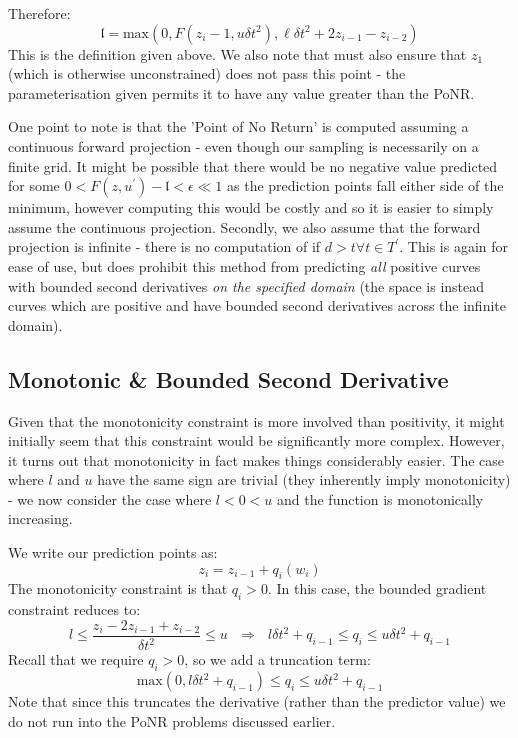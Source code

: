 \documentclass[]{article}
\begin{document}
\begin{itemize}
\begin{enumerate}
						Therefore:
						\begin{equation}
							\mathfrak{l} = \text{max}(0,F(z_i-1,u \delta t^2),\ell \delta t^2 + 2z_{i-1} - z_{i-2} )
						\end{equation}
						This is the definition given above. We also note that must also ensure that $z_1$ (which is otherwise unconstrained) does not pass this point - the parameterisation given permits it to have any value greater than the PoNR.

						One point to note is that the 'Point of No Return' is computed assuming a continuous forward projection - even though our sampling is necessarily on a finite grid. It might be possible that there would be no negative value predicted for some $0 < F(z,u^\prime) - \mathfrak{l} < \epsilon \ll 1$ as the prediction points fall either side of the minimum, however computing this would be costly and so it is easier to simply assume the continuous projection. Secondly, we also assume that the forward projection is infinite - there is no computation of if $d > t \forall t \in T^\prime$. This is again for ease of use, but does prohibit this method from predicting \textit{all} positive curves with bounded second derivatives \textit{on the specified domain} (the space is instead curves which are positive and have bounded second derivatives across the infinite domain).
					\end{enumerate}
				\end{itemize}

			\subsection{Monotonic \& Bounded Second Derivative}

				Given that the monotonicity constraint is more involved than positivity, it might initially seem that this constraint would be significantly more complex. However, it turns out that monotonicity in fact makes things considerably easier. The case where $l$ and $u$ have the same sign are trivial (they inherently imply monotonicity) - we now consider the case where $l < 0 < u$ and the function is monotonically increasing.

				We write our prediction points as:
				\begin{equation}
					z_i = z_{i-1} + q_i(w_i)
				\end{equation}
				The monotonicity constraint is that $q_i > 0$. In this case, the bounded gradient constraint reduces to:
				\begin{equation}
					l \leq \frac{z_{i} - 2 z_{i-1} + z_{i-2}}{\delta t^2} \leq u ~~~\Longrightarrow ~~~ l \delta t^2 + q_{i-1} \leq q_i \leq u \delta t^2 + q_{i-1}
				\end{equation}
				Recall that we require $q_i > 0$, so we add a truncation term:
				\begin{equation}
					\text{max}(0,l \delta t^2 + q_{i-1}) \leq q_i \leq u \delta t^2 + q_{i-1}
				\end{equation}
				Note that since this truncates the derivative (rather than the predictor value) we do not run into the PoNR problems discussed earlier. 
\end{document}

